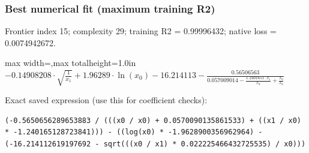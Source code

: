 \documentclass[10pt,letterpaper,landscape]{article}
\begin{document}
\begin{minipage}[t]{0.485\textwidth}
\subsubsection*{Best numerical fit (maximum training R2)}
Frontier index 15; complexity 29; training R2 = 0.99996432; native loss = 0.0074942672.
\begin{center}\begin{adjustbox}{max width=\linewidth,max totalheight=1.0in}$\displaystyle - 0.14908208 \cdot \sqrt{\frac{1}{x_{1}}} + 1.96289 \cdot \ln{\left(x_{0} \right)} - 16.214113 - \frac{0.56506563}{0.057009014 - \frac{1.2401651 \cdot x_{1}}{x_{0}} + \frac{x_{0}}{x_{0}}}$\end{adjustbox}\end{center}
{\scriptsize Exact saved expression (use this for coefficient checks):}
\begin{lstlisting}
(-0.5650656289653883 / (((x0 / x0) + 0.0570090135861533) + ((x1 / x0) * -1.240165128723841))) - ((log(x0) * -1.9628900356962964) - (-16.214112619197692 - sqrt(((x0 / x1) * 0.022225466432725535) / x0)))
\end{lstlisting}
\end{minipage}\hfill
\end{document}
